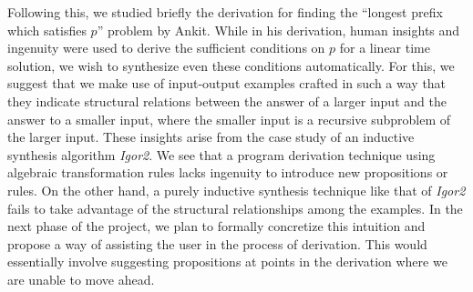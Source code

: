 Following this, we studied briefly the derivation for finding the ``longest prefix which satisfies $p$'' problem by Ankit. While in his derivation, human insights and ingenuity were used to derive the sufficient conditions on $p$ for a linear time solution, we wish to synthesize even these conditions automatically. For this, we suggest that we make use of input-output examples crafted in such a way that they indicate structural relations between the answer of a larger input and the answer to a smaller input, where the smaller input is a recursive subproblem of the larger input. These insights arise from the case study of an inductive synthesis algorithm \emph{Igor2}. We see that a program derivation technique using algebraic transformation rules lacks ingenuity to introduce new propositions or rules. On the other hand, a purely inductive synthesis technique like that of \emph{Igor2} fails to take advantage of the structural relationships among the examples. In the next phase of the project, we plan to formally concretize this intuition and propose a way of assisting the user in the process of derivation. This would essentially involve suggesting propositions at points in the derivation where we are unable to move ahead.
